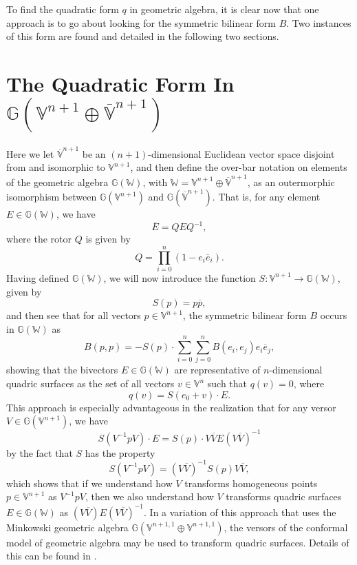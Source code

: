 \documentclass{birkjour}
\theoremstyle{definition}
\theoremstyle{remark}
\numberwithin{equation}{section}
\newcommand{\G}{\mathbb{G}}
\newcommand{\V}{\mathbb{V}}
\newcommand{\Vb}{\mathbb{\overline{V}}}
\newcommand{\W}{\mathbb{W}}
\begin{document}
To find the quadratic form $q$ in geometric algebra, it is clear now that one approach
is to go about looking for the symmetric bilinear form $B$.  Two instances of this form
are found and detailed in the following two sections.

\section{The Quadratic Form In $\G(\V^{n+1}\oplus\Vb^{n+1})$}

Here we let $\Vb^{n+1}$ be an $(n+1)$-dimensional Euclidean vector space
disjoint from and isomorphic to $\V^{n+1}$, and then define the over-bar notation on elements
of the geometric algebra $\G(\W)$, with $\W=\V^{n+1}\oplus\Vb^{n+1}$, as an
outermorphic isomorphism between $\G(\V^{n+1})$ and $\G(\Vb^{n+1})$.
That is, for any element $E\in\G(\W)$, we have
\begin{equation}
\overline{E} = QEQ^{-1},
\end{equation}
where the rotor $Q$ is given by
\begin{equation}
Q = \prod_{i=0}^n(1-e_i\overline{e}_i).
\end{equation}
Having defined $\G(\W)$, we will now introduce the function $S:\V^{n+1}\to\G(\W)$, given by
\begin{equation}
S(p) = p\overline{p},
\end{equation}
and then see that for all vectors $p\in\V^{n+1}$, the symmetric bilinear
form $B$ occurs in $\G(\W)$ as
\begin{equation}\label{equ_quadric_transformable}
B(p,p) = -S(p)\cdot\sum_{i=0}^n\sum_{j=0}^n B(e_i,e_j)e_i\overline{e}_j,
\end{equation}
showing that the bivectors $E\in\G(\W)$ are representative of $n$-dimensional
quadric surfaces as the set of all vectors $v\in\V^n$ such that $q(v)=0$, where
\begin{equation}\label{equ_quadric_form_in_ga}
q(v)=S(e_0+v)\cdot E.
\end{equation}
This approach is especially advantageous in the realization that for
any versor $V\in\G(\V^{n+1})$, we have
\begin{equation}
S(V^{-1}pV)\cdot E=S(p)\cdot V\overline{V}E(V\overline{V})^{-1}
\end{equation}
by the fact that $S$ has the property
\begin{equation}
S(V^{-1}pV)=(V\overline{V})^{-1}S(p)V\overline{V},
\end{equation}
which shows that if we understand how $V$ transforms homogeneous
points $p\in\V^{n+1}$ as $V^{-1}pV$, then we also understand
how $V$ transforms quadric surfaces $E\in\G(\W)$ as $(V\overline{V})E(V\overline{V})^{-1}$.
In a variation of this approach that uses the Minkowski geometric algebra $\G(\V^{n+1,1}\oplus\V^{n+1,1})$,
the versors of the conformal model of geometric algebra may be used to transform quadric surfaces.
Details of this can be found in \cite{}.
\end{document}
